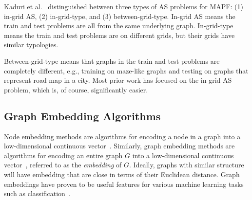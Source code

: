 \documentclass{ecai}
\newcommand{\Roni}[1]{}
\begin{document}


Kaduri et al.~\cite{kaduri2021experimental} distinguished between three types of AS problems for MAPF: 
(1) in-grid AS, (2) in-grid-type, and (3) between-grid-type. 
In-grid AS means the train and test problems are all from the same underlying graph. 
In-grid-type means the train and test problems are on different grids, but their grids have similar typologies. 
\Roni{I rephrased}
Between-grid-type means that graphs in the train and test problems are completely different, e.g., training on maze-like graphs and testing on graphs that represent road map in a city. Most prior work has focused on the in-grid AS problem, which is, of course, significantly easier. 










\subsection{Graph Embedding Algorithms}

Node embedding methods  are algorithms for encoding a node in a graph into a low-dimensional continuous vector~\cite{goyal2018graph}. 
Similarly, graph embedding methods are algorithms for encoding an entire graph $G$ into a low-dimensional continuous vector~\cite{goyal2018graph}, referred to as the \emph{embedding} of $G$. 
Ideally, graphs with similar structure will have embedding that are close in terms of their Euclidean distance. 
Graph embeddings have proven to be useful features for various machine learning tasks such as classification~\cite{you2020cross}.
\Roni{I simplified}
\end{document}
